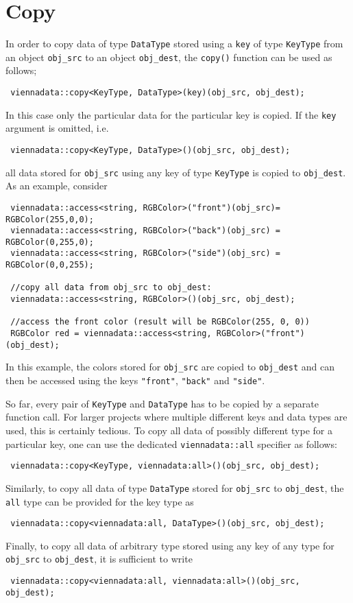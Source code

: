 \section{Copy} \label{sec:copy}
In order to copy data of type \lstinline|DataType| stored using a \lstinline|key| of type \lstinline|KeyType| from an object \lstinline|obj_src| to an object \lstinline|obj_dest|,
the \lstinline|copy()| function can be used as follows;
\begin{lstlisting}
 viennadata::copy<KeyType, DataType>(key)(obj_src, obj_dest);
\end{lstlisting}
In this case only the particular data for the particular key is copied. If the \lstinline|key| argument is omitted, i.e.
\begin{lstlisting}
 viennadata::copy<KeyType, DataType>()(obj_src, obj_dest);
\end{lstlisting}
all data stored for \lstinline|obj_src| using any key of type \lstinline|KeyType| is copied to \lstinline|obj_dest|.
As an example, consider
\begin{lstlisting}
 viennadata::access<string, RGBColor>("front")(obj_src)= RGBColor(255,0,0);
 viennadata::access<string, RGBColor>("back")(obj_src) = RGBColor(0,255,0);
 viennadata::access<string, RGBColor>("side")(obj_src) = RGBColor(0,0,255);

 //copy all data from obj_src to obj_dest:
 viennadata::access<string, RGBColor>()(obj_src, obj_dest);

 //access the front color (result will be RGBColor(255, 0, 0))
 RGBColor red = viennadata::access<string, RGBColor>("front")(obj_dest);
\end{lstlisting}
In this example, the colors stored for \lstinline|obj_src| are copied to \lstinline|obj_dest| and can then be accessed using the keys \lstinline|"front"|, \lstinline|"back"| and \lstinline|"side"|.


So far, every pair of \lstinline|KeyType| and \lstinline|DataType| has to be copied by a separate function call.
For larger projects where multiple different keys and data types are used, this is certainly tedious. To copy all
data of possibly different type for a particular key, one can use the dedicated \lstinline|viennadata::all| specifier as follows:
\begin{lstlisting}
 viennadata::copy<KeyType, viennadata:all>()(obj_src, obj_dest);
\end{lstlisting}
Similarly, to copy all data of type \lstinline|DataType| stored for \lstinline|obj_src| to \lstinline|obj_dest|, the \lstinline|all| type can be provided for the key type as
\begin{lstlisting}
 viennadata::copy<viennadata:all, DataType>()(obj_src, obj_dest);
\end{lstlisting}
Finally, to copy all data of arbitrary type stored using any key of any type for \lstinline|obj_src| to \lstinline|obj_dest|,
it is sufficient to write
\begin{lstlisting}
 viennadata::copy<viennadata:all, viennadata:all>()(obj_src, obj_dest);
\end{lstlisting}

